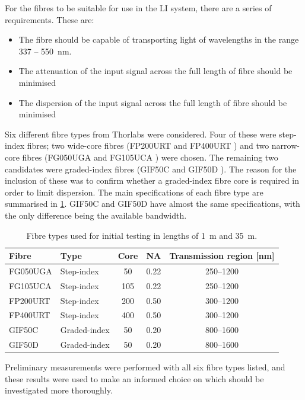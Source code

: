 \documentclass[a4paper,11pt]{article}
\begin{document}
For the fibres to be suitable for use in the LI system, there are a series of requirements. These are:
\begin{itemize}
\item The fibre should be capable of transporting light of wavelengths in the range 337 -- 550~nm.
\item The attenuation of the input signal across the full length of fibre should be minimised
\item The dispersion of the input signal across the full length of fibre should be minimised
\end{itemize}

Six different fibre types from Thorlabs were considered. Four of these were step-index fibres; two wide-core fibres (FP200URT \cite{bib:fp200urt} and FP400URT \cite{bib:fp400urt}) and two narrow-core fibres (FG050UGA \cite{bib:fg050uga} and FG105UCA \cite{bib:fg105uca}) were chosen. The remaining two candidates were graded-index fibres (GIF50C \cite{bib:gif50c} and GIF50D \cite{bib:gif50d}). The reason for the inclusion of these was to confirm whether a graded-index fibre core is required in order to limit dispersion. The main specifications of each fibre type are summarised in \cref{tab:fibres}. GIF50C and GIF50D have almost the same specifications, with the only difference being the available bandwidth.
\begin{table}[h]
\centering
\begin{tabular}{llccc}
\hline
Fibre	   & Type   		  & Core \diameter [$\mu$m] &  NA 	  &  Transmission region [nm]\\ \hline
FG050UGA   &  Step-index      &           \phantom{0}50  			&  0.22   &   250--1200       \\
FG105UCA   &  Step-index      &           105  			&  0.22   &   250--1200       \\
FP200URT   &  Step-index      &           200  			&  0.50   &   300--1200       \\
FP400URT   &  Step-index      &           400  			&  0.50   &   300--1200      \\
GIF50C     &  Graded-index    &           \phantom{0}50  			&  0.20	  &   800--1600       \\
GIF50D     &  Graded-index    &           \phantom{0}50 			&  0.20   &   800--1600      \\ \hline
\end{tabular}
\caption{Fibre types used for initial testing in lengths of 1~m and 35~m.}\label{tab:fibres}
\end{table}
Preliminary measurements were performed with all six fibre types listed, and these results were used to make an informed choice on which should be investigated more thoroughly.
\end{document}
